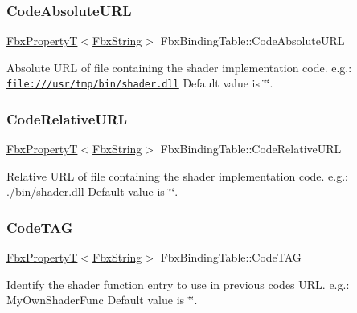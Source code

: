 \subsubsection{\texorpdfstring{Code\+Absolute\+U\+RL}{CodeAbsoluteURL}}
{\footnotesize\ttfamily \hyperlink{class_fbx_property_t}{Fbx\+PropertyT}$<$\hyperlink{class_fbx_string}{Fbx\+String}$>$ Fbx\+Binding\+Table\+::\+Code\+Absolute\+U\+RL}

Absolute U\+RL of file containing the shader implementation code. e.\+g.\+: \href{file:///usr/tmp/bin/shader.dll}{\tt file\+:///usr/tmp/bin/shader.\+dll} Default value is \char`\"{}\char`\"{}. \mbox{\label{class_fbx_binding_table_add10ea889f7b9e37ca0fbbf27dfc140f}} 
\subsubsection{\texorpdfstring{Code\+Relative\+U\+RL}{CodeRelativeURL}}
{\footnotesize\ttfamily \hyperlink{class_fbx_property_t}{Fbx\+PropertyT}$<$\hyperlink{class_fbx_string}{Fbx\+String}$>$ Fbx\+Binding\+Table\+::\+Code\+Relative\+U\+RL}

Relative U\+RL of file containing the shader implementation code. e.\+g.\+: ./bin/shader.dll Default value is \char`\"{}\char`\"{}. \mbox{\label{class_fbx_binding_table_ac1c73d117768ad0373d277a81e021fa3}} 
\subsubsection{\texorpdfstring{Code\+T\+AG}{CodeTAG}}
{\footnotesize\ttfamily \hyperlink{class_fbx_property_t}{Fbx\+PropertyT}$<$\hyperlink{class_fbx_string}{Fbx\+String}$>$ Fbx\+Binding\+Table\+::\+Code\+T\+AG}

Identify the shader function entry to use in previous code\textquotesingle{}s U\+RL. e.\+g.\+: My\+Own\+Shader\+Func Default value is \char`\"{}\char`\"{}. \mbox{\label{class_fbx_binding_table_ad0c914d07b49a91d79eda8d39fda6cf7}} 
